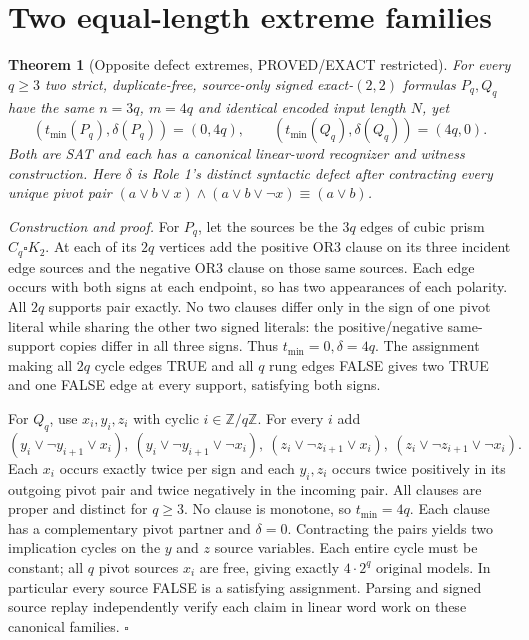 \documentclass[11pt]{article}
\newtheorem{theorem}{Theorem}
\begin{document}
\section{Two equal-length extreme families}
\begin{theorem}[Opposite defect extremes, PROVED/EXACT restricted]
For every $q\ge3$ two strict, duplicate-free, source-only signed exact-$(2,2)$ formulas $P_q,Q_q$ have the same $n=3q$, $m=4q$ and identical encoded input length $N$, yet
\[
(t_{\min}(P_q),\delta(P_q))=(0,4q),\qquad
(t_{\min}(Q_q),\delta(Q_q))=(4q,0).
\]
Both are SAT and each has a canonical linear-word recognizer and witness construction. Here $\delta$ is Role 1's distinct syntactic defect after contracting every unique pivot pair $(a\vee b\vee x)\wedge(a\vee b\vee\neg x)\equiv(a\vee b)$.
\end{theorem}
\noindent\emph{Construction and proof.} For $P_q$, let the sources be the $3q$ edges of cubic prism $C_q\square K_2$. At each of its $2q$ vertices add the positive OR3 clause on its three incident edge sources and the negative OR3 clause on those same sources. Each edge occurs with both signs at each endpoint, so has two appearances of each polarity. All $2q$ supports pair exactly. No two clauses differ only in the sign of one pivot literal while sharing the other two signed literals: the positive/negative same-support copies differ in all three signs. Thus $t_{\min}=0,\delta=4q$. The assignment making all $2q$ cycle edges TRUE and all $q$ rung edges FALSE gives two TRUE and one FALSE edge at every support, satisfying both signs.

For $Q_q$, use $x_i,y_i,z_i$ with cyclic $i\in\mathbb Z/q\mathbb Z$. For every $i$ add
\[
(y_i\vee\neg y_{i+1}\vee x_i),\
(y_i\vee\neg y_{i+1}\vee\neg x_i),\
(z_i\vee\neg z_{i+1}\vee x_i),\
(z_i\vee\neg z_{i+1}\vee\neg x_i).
\]
Each $x_i$ occurs exactly twice per sign and each $y_i,z_i$ occurs twice positively in its outgoing pivot pair and twice negatively in the incoming pair. All clauses are proper and distinct for $q\ge3$. No clause is monotone, so $t_{\min}=4q$. Each clause has a complementary pivot partner and $\delta=0$. Contracting the pairs yields two implication cycles on the $y$ and $z$ source variables. Each entire cycle must be constant; all $q$ pivot sources $x_i$ are free, giving exactly $4\cdot 2^q$ original models. In particular every source FALSE is a satisfying assignment. Parsing and signed source replay independently verify each claim in linear word work on these canonical families. \hfill$\square$
\end{document}
